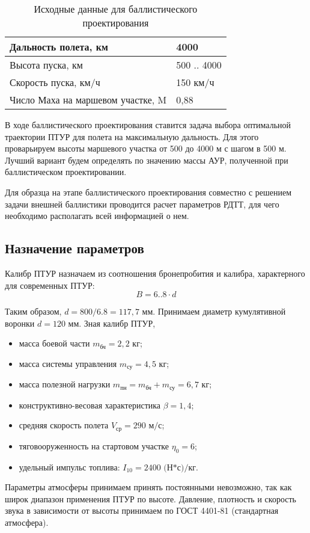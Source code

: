 \begin{table}[!h]
	\begin{center}
		\caption{Исходные данные для баллистического проектирования}
		\begin{tabular}{|l|l|}
  		\hline
Дальность полета, км & 4000 \\ \hline
Высота пуска, км & 500 .. 4000 \\ \hline
Скорость пуска, км/ч & 150 км/ч \\ \hline
Число Маха на маршевом участке, M & 0,88 \\ \hline
		\end{tabular}
		\label{tab:bal_proekt_nu}
	\end{center}
\end{table}

В ходе баллистического проектирования ставится задача выбора оптимальной траектории ПТУР для полета на максимальную дальность. Для этого проварьируем высоты маршевого участка от 500 до 4000 м с шагом в 500 м. Лучший вариант будем определять по значению массы АУР, полученной при баллистическом проектировании.

Для образца на этапе баллистического проектирования совместно с решением задачи внешней баллистики проводится расчет параметров РДТТ, для чего необходимо располагать всей информацией о нем.

\subsection{Назначение параметров}
Калибр ПТУР назначаем из соотношения бронепробития и калибра, характерного для современных ПТУР:
\[ B = 6..8 \cdot d \]

Таким образом, $d = 800/6.8 = 117,7 \text{ мм}$. Принимаем диаметр кумулятивной воронки $d = 120 \text{ мм}$. Зная калибр ПТУР,
\begin{itemize}
	\item масса боевой части $m_{\text{бч}} = 2,2 \text{ кг}$;
	\item масса системы управления $m_{\text{су}} = 4,5 \text{ кг}$;
	\item масса полезной нагрузки $m_{\text{пн}} = m_{\text{бч}} + m_{\text{су}} = 6,7 \text{ кг}$;
	\item конструктивно-весовая характеристика $\beta = 1,4$;
	\item средняя скорость полета $V_{\text{ср}} = 290 \text{ м/с}$;
	\item тяговооруженность на стартовом участке $\eta_0 = 6$;
	\item удельный импульс топлива:    $I_{10} = 2400 \text{ (Н*с)/кг}$.
\end{itemize}
Параметры атмосферы принимаем принять постоянными невозможно, так как широк диапазон применения ПТУР по высоте. Давление, плотность и скорость звука в зависимости от высоты принимаем по ГОСТ 4401-81 (стандартная атмосфера).

